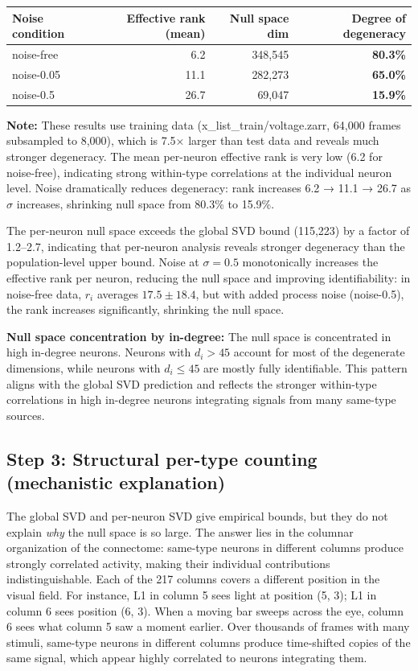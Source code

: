 \documentclass[11pt,a4paper]{article}
\begin{document}
\begin{center}
\begin{tabular}{lrrr}
\toprule
Noise condition & Effective rank (mean) & Null space dim & \textbf{Degree of degeneracy} \\
\midrule
noise-free & 6.2 & 348,545 & \textbf{80.3\%} \\
noise-0.05 & 11.1 & 282,273 & \textbf{65.0\%} \\
noise-0.5 & 26.7 & 69,047 & \textbf{15.9\%} \\
\bottomrule
\end{tabular}
\end{center}

\noindent\textbf{Note:} These results use training data (x\_list\_train/voltage.zarr, 64,000 frames subsampled to 8,000), which is 7.5× larger than test data and reveals much stronger degeneracy. The mean per-neuron effective rank is very low (6.2 for noise-free), indicating strong within-type correlations at the individual neuron level. Noise dramatically reduces degeneracy: rank increases 6.2 → 11.1 → 26.7 as $\sigma$ increases, shrinking null space from 80.3\% to 15.9\%.

The per-neuron null space exceeds the global SVD bound (115,223) by a factor of 1.2--2.7, indicating that per-neuron analysis reveals stronger degeneracy than the population-level upper bound. Noise at $\sigma = 0.5$ monotonically increases the effective rank per neuron, reducing the null space and improving identifiability: in noise-free data, $r_i$ averages $17.5 \pm 18.4$, but with added process noise (noise-0.5), the rank increases significantly, shrinking the null space.

\noindent\textbf{Null space concentration by in-degree:} The null space is concentrated in high in-degree neurons. Neurons with $d_i > 45$ account for most of the degenerate dimensions, while neurons with $d_i \leq 45$ are mostly fully identifiable. This pattern aligns with the global SVD prediction and reflects the stronger within-type correlations in high in-degree neurons integrating signals from many same-type sources.

\subsection{Step 3: Structural per-type counting (mechanistic explanation)}

The global SVD and per-neuron SVD give empirical bounds, but they do not explain \emph{why} the null space is so large. The answer lies in the columnar organization of the connectome: same-type neurons in different columns produce strongly correlated activity, making their individual contributions indistinguishable. Each of the 217 columns covers a different position in the visual field. For instance, L1 in column 5 sees light at position (5, 3); L1 in column 6 sees position (6, 3). When a moving bar sweeps across the eye, column 6 sees what column 5 saw a moment earlier. Over thousands of frames with many stimuli, same-type neurons in different columns produce time-shifted copies of the same signal, which appear highly correlated to neurons integrating them.
\end{document}
